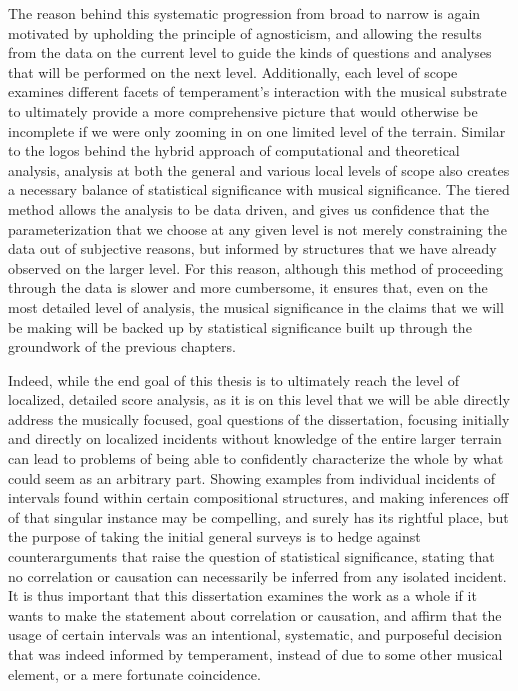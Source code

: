 The reason behind this systematic progression from broad to narrow is
again motivated by upholding the principle of agnosticism, and allowing
the results from the data on the current level to guide the kinds of
questions and analyses that will be performed on the next level.
Additionally, each level of scope examines different facets of
temperament's interaction with the musical substrate to ultimately
provide a more comprehensive picture that would otherwise be incomplete
if we were only zooming in on one limited level of the terrain. Similar
to the logos behind the hybrid approach of computational and theoretical
analysis, analysis at both the general and various local levels of scope
also creates a necessary balance of statistical significance with
musical significance. The tiered method allows the analysis to be data
driven, and gives us confidence that the parameterization that we choose
at any given level is not merely constraining the data out of subjective
reasons, but informed by structures that we have already observed on the
larger level. For this reason, although this method of proceeding
through the data is slower and more cumbersome, it ensures that, even on
the most detailed level of analysis, the musical significance in the
claims that we will be making will be backed up by statistical
significance built up through the groundwork of the previous chapters.

Indeed, while the end goal of this thesis is to ultimately reach the
level of localized, detailed score analysis, as it is on this level that
we will be able directly address the musically focused, goal questions
of the dissertation, focusing initially and directly on localized
incidents without knowledge of the entire larger terrain can lead to
problems of being able to confidently characterize the whole by what
could seem as an arbitrary part. Showing examples from individual
incidents of intervals found within certain compositional structures,
and making inferences off of that singular instance may be compelling,
and surely has its rightful place, but the purpose of taking the initial
general surveys is to hedge against counterarguments that raise the
question of statistical significance, stating that no correlation or
causation can necessarily be inferred from any isolated incident. It is
thus important that this dissertation examines the work as a whole if it
wants to make the statement about correlation or causation, and affirm
that the usage of certain intervals was an intentional, systematic, and
purposeful decision that was indeed informed by temperament, instead of
due to some other musical element, or a mere fortunate coincidence.


